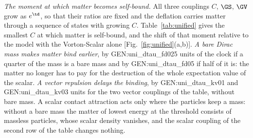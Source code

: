 \emph{The moment at which matter becomes self-bound.} All three couplings $C$, $\GS$, $\GV$ grow as
$e^{\td}$, so that their ratios are fixed and the deflation carries matter through a sequence of
states with growing $C$. Table~\ref{tab:unified} gives the smallest $C$ at which matter is
self-bound, and the shift of that moment relative to the model with the Vorton-Scalar alone
[Fig.~\ref{fig:unified}(a,b)]. \emph{A bare Dirac mass makes matter bind earlier}, by
{{GEN:uni_dtau_fd025}} units of the clock if a quarter of the mass is a bare mass and by
{{GEN:uni_dtau_fd05}} if half of it is: the matter no longer has to pay for the destruction of the
whole expectation value of the scalar. \emph{A vector repulsion delays the binding}, by
{{GEN:uni_dtau_kv01}} and {{GEN:uni_dtau_kv03}} units for the two vector couplings of the table,
without bare mass. A scalar contact attraction acts only where the particles keep a mass: without a
bare mass the matter of lowest energy at the threshold consists of massless particles, whose scalar
density vanishes, and the scalar coupling of the second row of the table changes nothing.

